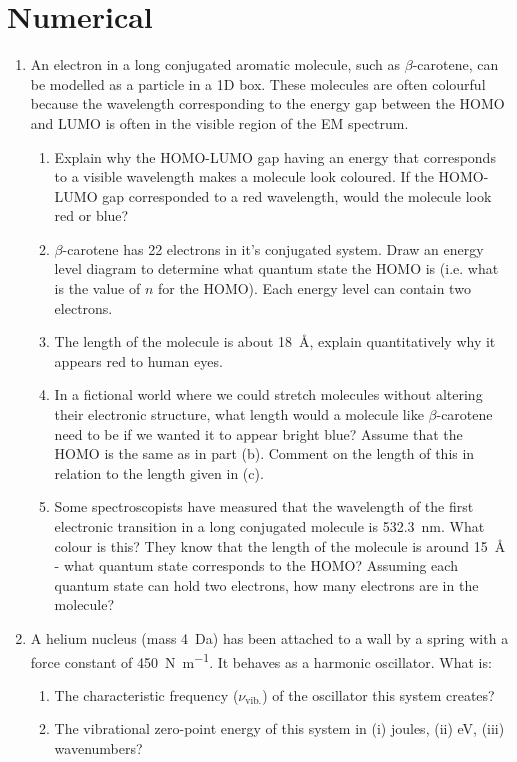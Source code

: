 \documentclass{memoir}[11pt,oneside,a4paper,openany]
\begin{document}
\section*{Numerical}
\begin{enumerate}
\item An electron in a long conjugated aromatic molecule, such as $\beta$-carotene, can be modelled as a particle in a 1D box. These molecules are often colourful because the wavelength corresponding to the energy gap between the HOMO and LUMO is often in the visible region of the EM spectrum. 
\begin{enumerate}
	\item Explain why the HOMO-LUMO gap having an energy that corresponds to a visible wavelength makes a molecule look coloured. If the HOMO-LUMO gap corresponded to a red wavelength, would the molecule look red or blue?
	\item $\beta$-carotene has 22 electrons in it's conjugated system. Draw an energy level diagram to determine what quantum state the HOMO is (i.e. what is the value of $n$ for the HOMO). Each energy level can contain two electrons.
	\item The length of the molecule is about \SI{18}{\angstrom}, explain quantitatively why it appears red to human eyes.
	\item In a fictional world where we could stretch molecules without altering their electronic structure, what length would a molecule like $\beta$-carotene need to be if we wanted it to appear bright blue? Assume that the HOMO is the same as in part (b). Comment on the length of this in relation to the length given in (c). 
	\item Some spectroscopists have measured that the wavelength of the first electronic transition in a long conjugated molecule is \SI{532.3}{\nano\metre}. What colour is this? They know that the length of the molecule is around \SI{15}{\angstrom} - what quantum state corresponds to the HOMO? Assuming each quantum state can hold two electrons, how many electrons are in the molecule?
\end{enumerate}
\item A helium nucleus (mass \SI{4}{\dalton}) has been attached to a wall by a spring with a force constant of \SI{450}{\newton\per\metre}. It behaves as a harmonic oscillator. What is:
	\begin{enumerate}
		\item The characteristic frequency ($\nu_{\text{vib.}}$) of the oscillator this system creates?
		\item The vibrational zero-point energy of this system in (i) joules, (ii) eV, (iii) wavenumbers?

\end{enumerate}
\end{enumerate}
\end{document}
